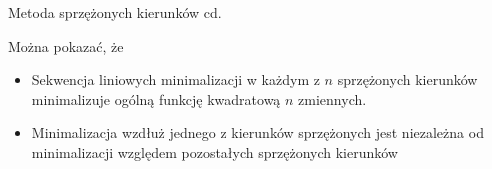 \begin{frame}{Metoda sprzężonych kierunków cd.}
    
 	\begin{block}{Można pokazać, że}
 	\begin{itemize}
 	    \item   Sekwencja liniowych minimalizacji w każdym z $n$ sprzężonych kierunków minimalizuje ogólną funkcję kwadratową $n$ zmiennych.
 	    \item Minimalizacja wzdłuż jednego z kierunków sprzężonych jest niezależna od minimalizacji  względem pozostałych sprzężonych kierunków
 	\end{itemize}
 	\end{block}
 	







\end{frame}
